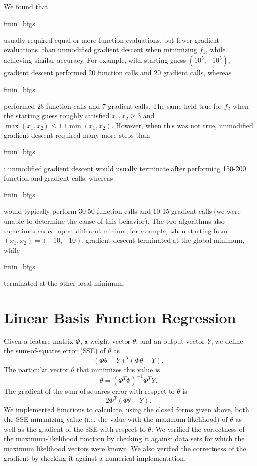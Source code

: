 \documentclass{article}
\begin{document}
We found that \begin{tt}fmin\_bfgs\end{tt} usually required equal or more function evaluations, but fewer gradient evaluations, than unmodified gradient descent when minimizing $f_1$, while achieving similar accuracy. For example, with starting guess $(10^5, -10^5)$, gradient descent performed 20 function calls and 20 gradient calls, whereas \begin{tt}fmin\_bfgs\end{tt} performed 28 function calls and 7 gradient calls. The same held true for $f_2$ when the starting guess roughly satisfied $x_1, x_2 \ge 3$ and $\max (x_1, x_2) \le 1.1\min (x_1, x_2)$. However, when this was not true, unmodified gradient descent required many more steps than \begin{tt}fmin\_bfgs\end{tt}: unmodified gradient descent would usually terminate after performing 150-200 function and gradient calls, whereas \begin{tt}fmin\_bfgs\end{tt} would typically perform 30-50 function calls and 10-15 gradient calls (we were unable to determine the cause of this behavior). The two algorithms also sometimes ended up at different minima; for example, when starting from $(x_1, x_2) = (-10, -10)$, gradient descent terminated at the global minimum, while \begin{tt}fmin\_bfgs\end{tt} terminated at the other local minimum.

\section{Linear Basis Function Regression}
Given a feature matrix $\Phi$, a weight vector $\theta$, and an output vector $Y$, we define the sum-of-squares error (SSE) of $\theta$ as
$$(\Phi\theta - Y)^T(\Phi\theta - Y).$$
The particular vector $\theta$ that minimizes this value is
$$\theta = (\Phi^T\Phi)^{-1}\Phi^TY.$$
The gradient of the sum-of-squares error with respect to $\theta$ is
$$2\Phi^T(\Phi\theta - Y).$$
We implemented functions to calculate, using the closed forms given above, both the SSE-minimizing value (i.e. the value with the maximum likelihood) of $\theta$ as well as the gradient of the SSE with respect to $\theta$. We verified the correctness of the maximum-likelihood function by checking it against data sets for which the maximum likelihood vectors were known. We also verified the correctness of the gradient by checking it against a numerical implementation.
\end{document}
